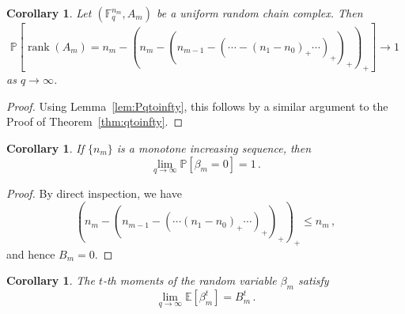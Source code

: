 \documentclass[3p,times]{elsarticle}
\newtheorem{corollary}[theorem]{Corollary}
\theoremstyle{remark}
\DeclareMathOperator{\rank}{\mathrm{rank}}
\newcommand\Fqn[1]{\mathbb{F}_q^{#1}}
\newcommand{\bP}{\mathbb{P}}
\newcommand{\ra}{\rightarrow}
\begin{document}
\begin{corollary}
  Let $(\Fqn{n_m},A_m)$ be a uniform random chain complex. Then
  \[
    \bP[\rank(A_m) = n_m-(n_m-(n_{m-1} -( \cdots -(n_1-n_0)_+ \cdots )_+ )_+)_+]
    \ra 1 \,
  \]
  as $q \ra \infty$.
\end{corollary}

\begin{proof}
  Using Lemma~\ref{lem:Pqtoinfty}, this follows by a similar argument to the
  Proof of Theorem~\ref{thm:qtoinfty}.
\end{proof}

\begin{corollary}
  \label{cor:inc}
  If $\{n_m\}$ is a monotone increasing sequence, then 
  \[
    \lim_{q \ra \infty} \bP[\beta_m = 0] = 1 \, .
  \]
\end{corollary}

\begin{proof}
  By direct inspection, we have
  \[
    (n_m - (n_{m-1} - ( \cdots (n_1 - n_0)_+ \cdots )_+)_+)_+ \leq n_m \, ,
  \]
  and hence $B_m = 0$.
\end{proof}

\begin{corollary}
  The $t$-th moments of the random variable $\beta_m$ satisfy
  \[
    \lim_{q \ra \infty} \mathbb{E}\left[\beta_m^t \right] = B_m^t \, .
  \]
\end{corollary}




\end{document}
